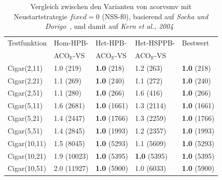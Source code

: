 \documentclass[fontsize=12, a4aper]{scrartcl}
\begin{document}
	\begin{table}[H]
		
		\caption{Vergleich zwischen den Varianten von \acl{acorvsmv} mit Neustartstrategie \(fixed = 0\) (NSS-f0), basierend auf \textit{Socha und Dorigo}~\cite{socha2008ant}, und damit auf \textit{Kern et al., 2004}~\cite{kern2004learning}}
		
		\label{subsec:Vergleich_Von_ACO_R_ACO_R_Very_Simple_Und_Iterationen:tab:Vergleich_Probabilistisches_Lernen_Funktionen_Mit_Gemischten_Variablen_Teil_1}
		
		\scriptsize
		
		\begin{tabularx}{\linewidth}{X X X X X}
			
			\toprule
			
			Testfunktion & Hom-HPB- & Het-HPB- & Het-HSPPB- & Bestwert\\
			
			& ACO\(_\mathbb{R}\)-VS & ACO\(_\mathbb{R}\)-VS & ACO\(_\mathbb{R}\)-VS & \\
			
			\midrule
			
			Cigar(2,11) & 1.0 (219) & \textbf{1.0} (218) & 1.2 (263) & \textbf{1.0} (218)\\
			
			Cigar(2,21) & 1.1 (269) & \textbf{1.0} (240) & 1.1 (272) & \textbf{1.0} (240)\\
			
			Cigar(2,51) & 1.1 (280) & \textbf{1.0} (266) & 1.6 (416) & \textbf{1.0} (266)\\
			
			Cigar(5,11) & 1.6 (2681) & \textbf{1.0} (1661) & 1.3 (2114) & \textbf{1.0} (1661)\\
			
			Cigar(5,21) & 1.4 (2447) & \textbf{1.0} (1766) & 1.3 (2259) & \textbf{1.0} (1766)\\
			
			Cigar(5,51) & 1.4 (2845) & \textbf{1.0} (1993) & 1.2 (2357) & \textbf{1.0} (1993)\\
			
			Cigar(10,11) & 1.5 (8045) & \textbf{1.0} (5293) & 1.1 (5609) & \textbf{1.0} (5293)\\
			
			Cigar(10,21) & 1.9 (10023) & \textbf{1.0} (5395) & \textbf{1.0} (5395) & \textbf{1.0} (5395)\\
			
			Cigar(10,51) & 2.0 (11927) & \textbf{1.0} (5900) & 1.0 (6033) & \textbf{1.0} (5900)\\
			

\end{tabularx}
\end{table}
\end{document}

